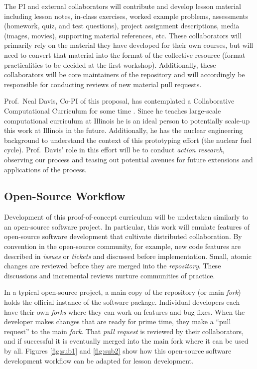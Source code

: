 \documentclass[11pt]{article}
\begin{document}
          The PI and external collaborators will contribute and develop lesson 
          material including lesson notes, in-class exercises, worked example 
          problems, assessments (homework, quiz, and test questions), project 
          assignment descriptions, media (images, movies), supporting material 
          references, etc. These collaborators will primarily rely on the 
          material they have developed for their own courses, but will need to 
          convert that material into the format of the collective resource 
          (format practicalities to be decided at the first workshop). Additionally, these 
          collaborators will be core maintainers of the repository and will 
          accordingly be responsible for conducting reviews of new material 
          pull requests.

          Prof.~Neal Davis, Co-PI of this proposal, has contemplated a 
          Collaborative Computational Curriculum for some time 
          \cite{davis_university_2016}. Since he 
          teaches large-scale computational curriculum at Illinois 
          he is an ideal person to potentially scale-up this work at Illinois in the 
          future. Additionally, he has the nuclear engineering background to 
          understand the context of this prototyping effort (the nuclear fuel 
          cycle). Prof.~Davis' role 
          in this effort will be to conduct \emph{action research}, observing 
          our process and teasing out potential avenues for future 
          extensions and applications of the process. 

          \subsection{Open-Source Workflow}
          Development of this proof-of-concept curriculum will be undertaken 
          similarly to an open-source software project. 
          In particular, this work will emulate features of open-source software development 
          that cultivate distributed collaboration. By convention in the open-source community, for 
          example, new code features are described in \emph{issues} or 
          \emph{tickets} and discussed before implementation. Small, atomic 
          changes are reviewed before they are merged into the 
          \emph{repository}. These discussions and incremental reviews nurture 
          communities of practice.

          In a typical open-source project, a main copy of the 
          repository (or main \emph{fork}) holds the 
          official instance of the software package. Individual developers each have their own 
          \emph{forks} where they can work on features and 
          bug fixes. When the developer makes changes that are ready for prime 
          time, they make a ``pull request'' to the main \emph{fork}. That 
          \emph{pull request} is 
          reviewed by their collaborators, and if successful it is eventually merged into the 
          main fork where it can be used by all. Figures 
          \ref{fig:sub1} and \ref{fig:sub2} show how this open-source software 
          development workflow can be adapted for lesson development.
\end{document}
